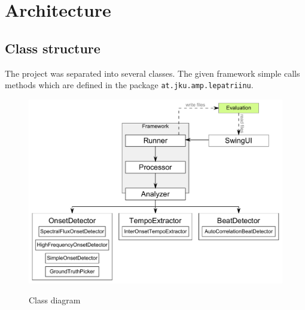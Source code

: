 \chapter{Architecture} \label{cpt:architecture}

\section{Class structure}
The project was separated into several classes. The given framework simple calls
methods which are defined in the package \texttt{at.jku.amp.lepatriinu}.


\begin{figure}[htp]
  \centering
  \includegraphics[width=\textwidth]{chapter/ClassDiagram}
  \label{fig:classdiagram}
  \caption{Class diagram}
\end{figure}





